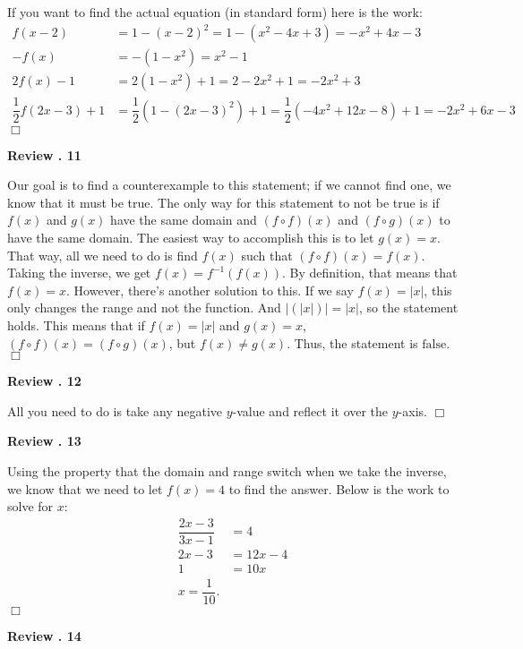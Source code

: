 \documentclass[lang=en,11pt]{elegantbook}
\begin{document}
If you want to find the actual equation (in standard form) here is the work: \begin{align*}
    f(x-2)&=1-(x-2)^2=1-(x^2-4x+3)=-x^2+4x-3 \\
    -f(x)&=-(1-x^2)=x^2-1 \\
    2f(x)-1&=2(1-x^2)+1=2-2x^2+1=-2x^2+3 \\
    \dfrac{1}{2}f(2x-3)+1&=\dfrac{1}{2}\left(1-(2x-3)^2\right)+1=\dfrac{1}{2}\left(-4x^2+12x-8\right)+1=-2x^2+6x-3
\end{align*}$\Box$

\noindent \textbf{Review . 11}

Our goal is to find a counterexample to this statement; if we cannot find one, we know that it must be true.  The only way for this statement to not be true is if $f(x)$ and $g(x)$ have the same domain and $(f\circ f)(x)$ and $(f\circ g)(x)$ to have the same domain.  The easiest way to accomplish this is to let $g(x)=x$.  That way, all we need to do is find $f(x)$ such that $(f\circ f)(x)=f(x)$.  Taking the inverse, we get $f(x)=f^{-1}\left(f(x)\right)$.  By definition, that means that $f(x)=x$.  However, there's another solution to this.  If we say $f(x)=|x|$, this only changes the range and not the function.  And $|(|x|)|=|x|$, so the statement holds.  This means that if $f(x)=|x|$ and $g(x)=x$, $(f\circ f)(x)=(f\circ g)(x)$, but $f(x)\neq g(x)$.  Thus, the statement is $\boxed{\text{false}}$. $\Box$ \vspace{3mm}

\noident \textbf{Review . 12}

All you need to do is take any negative $y$-value and reflect it over the $y$-axis. $\Box$

\noindent \textbf{Review . 13}

Using the property that the domain and range switch when we take the inverse, we know that we need to let $f(x)=4$ to find the answer.  Below is the work to solve for $x$: \begin{align*}
    \dfrac{2x-3}{3x-1}&=4 \\ 2x-3 &= 12x-4 \\ 1&=10x \\ \boxed{x=\dfrac{1}{10}}.
\end{align*} $\Box$

\noindent \textbf{Review . 14}
\end{document}
